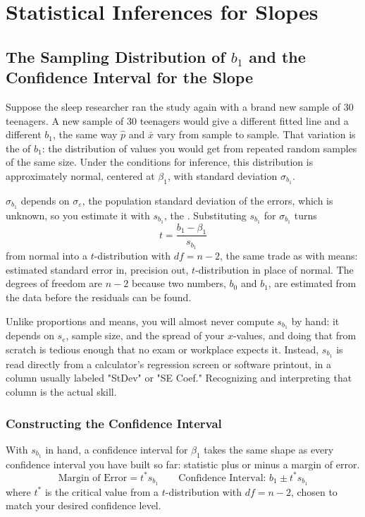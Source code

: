 \chapter{Statistical Inferences for Slopes}

\section{The Sampling Distribution of $b_1$ and the Confidence Interval for the Slope}

Suppose the sleep researcher ran the study again with a brand new sample of $30$ teenagers. A new sample of $30$ teenagers would give a different fitted line and a different $b_1$, the same way $\hat{p}$ and $\bar{x}$ vary from sample to sample. That variation is the  of $b_1$: the distribution of values you would get from repeated random samples of the same size. Under the conditions for inference, this distribution is approximately normal, centered at $\beta_1$, with standard deviation $\sigma_{b_1}$.

$\sigma_{b_1}$ depends on $\sigma_\varepsilon$, the population standard deviation of the errors, which is unknown, so you estimate it with $s_{b_1}$, the . Substituting $s_{b_1}$ for $\sigma_{b_1}$ turns
\[
t = \frac{b_1 - \beta_1}{s_{b_1}}
\]
from normal into a $t$-distribution with $df = n - 2$, the same trade as with means: estimated standard error in, precision out, $t$-distribution in place of normal. The degrees of freedom are $n - 2$ because two numbers, $b_0$ and $b_1$, are estimated from the data before the residuals can be found.

Unlike proportions and means, you will almost never compute $s_{b_1}$ by hand: it depends on $s_e$, sample size, and the spread of your $x$-values, and doing that from scratch is tedious enough that no exam or workplace expects it. Instead, $s_{b_1}$ is read directly from a calculator's regression screen or software printout, in a column usually labeled "StDev" or "SE Coef." Recognizing and interpreting that column is the actual skill.

\subsection*{Constructing the Confidence Interval}

With $s_{b_1}$ in hand, a confidence interval for $\beta_1$ takes the same shape as every confidence interval you have built so far: statistic plus or minus a margin of error.
\[
\text{Margin of Error} = t^*s_{b_1} \qquad \text{Confidence Interval: } b_1 \pm t^*s_{b_1}
\]
where $t^*$ is the critical value from a $t$-distribution with $df = n-2$, chosen to match your desired confidence level.

